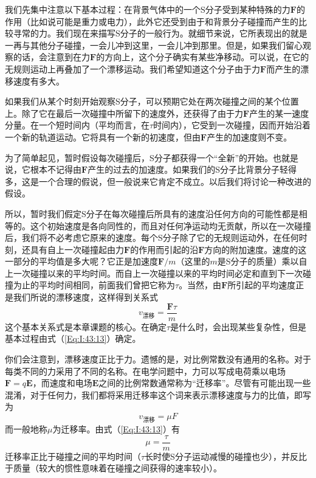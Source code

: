 我们先集中注意以下基本过程：在背景气体中的一个S分子受到某种特殊的力$\boldsymbol{F}$的作用（比如说可能是重力或电力），此外它还受到由于和背景分子碰撞而产生的比较寻常的力。我们现在来描写S分子的一般行为。就细节来说，它所表现出的就是一再与其他分子碰撞，一会儿冲到这里，一会儿冲到那里。但是，如果我们留心观察的话，会注意到在力$\boldsymbol{F}$的方向上，这个分子确实有某些净移动。可以说，在它的无规则运动上再叠加了一个漂移运动。我们希望知道这个分子由于力$\boldsymbol{F}$而产生的漂移速度有多大。

如果我们从某个时刻开始观察S分子，可以预期它处在两次碰撞之间的某个位置上。除了它在最后一次碰撞中所留下的速度外，还获得了由于力$\boldsymbol{F}$产生的某一速度分量。在一个短时间内（平均而言，在$\tau$时间内），它受到一次碰撞，因而开始沿着一个新的轨道运动。它将具有一个新的初速度，但由$\boldsymbol{F}$产生的加速度则不变。

为了简单起见，暂时假设每次碰撞后，S分子都获得一个“全新”的开始。也就是说，它根本不记得由$\boldsymbol{F}$产生的过去的加速度。如果我们的S分子比背景分子轻得多，这是一个合理的假说，但一般说来它肯定不成立。以后我们将讨论一种改进的假设。

所以，暂时我们假定S分子在每次碰撞后所具有的速度沿任何方向的可能性都是相等的。这个初始速度是各向同性的，而且对任何净运动均无贡献，所以在一次碰撞后，我们将不必考虑它原来的速度。每个S分子除了它的无规则运动外，在任何时刻，还具有自上一次碰撞起由力$\boldsymbol{F}$的作用而引起的沿$\boldsymbol{F}$方向的附加速度。速度的这一部分的平均值是多大呢？它正是加速度$\boldsymbol{F}/m$（这里的$m$是S分子的质量）乘以自上一次碰撞以来的平均时间。而自上一次碰撞以来的平均时间必定和直到下一次碰撞为止的平均时间相同，前面我们曾把它称为$\tau$。当然，由$\boldsymbol{F}$所引起的平均速度正是我们所说的漂移速度，这样得到关系式
\begin{equation}
    \label{Eq:I:43:13}
    v_\text{漂移} = \frac{\boldsymbol{F}\tau}{m}
\end{equation}
这个基本关系式是本章课题的核心。在确定$\tau$是什么时，会出现某些复杂性，但是基本过程由式（\ref{Eq:I:43:13}）确定。

你们会注意到，漂移速度正比于力。遗憾的是，对比例常数没有通用的名称。对于每类不同的力采用了不同的名称。在电学问题中，力可以写成电荷乘以电场$\boldsymbol{F}=q\boldsymbol{E}$，而速度和电场$\boldsymbol{E}$之间的比例常数通常称为“迁移率”。尽管有可能出现一些混淆，对于任何力，我们都将采用迁移率这个词来表示漂移速度与力的比值，即写为
\begin{equation}
    \label{Eq:I:43:14}
    v_\text{漂移} = \mu F
\end{equation}
而一般地称$\mu$为迁移率。由式（\ref{Eq:I:43:13}）有
\begin{equation}
    \label{Eq:I:43:15}
    \mu=\frac{\tau}{m}
\end{equation}
迁移率正比于碰撞之间的平均时间（$\tau$长时使S分子运动减慢的碰撞也少），并反比于质量（较大的惯性意味着在碰撞之间获得的速率较小）。

